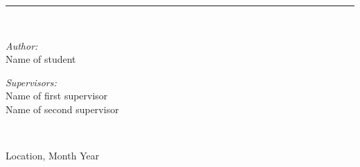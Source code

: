 \begin{titlepage}
\begin{center}
    \rule{350pt}{4pt} \\[4cm]

    \begin{minipage}{0.4\textwidth}
      \begin{flushleft} \large
        \emph{Author:} \\ [0.2cm]
        Name of student\\
      \end{flushleft}
    \end{minipage}
    \begin{minipage}{0.45\textwidth}
      \begin{flushright} \large
        \emph{Supervisors:} \\[0.2cm]
        Name of first supervisor\\[0.1cm]
        Name of second supervisor\\
      \end{flushright}
    \end{minipage}
    \\[1cm]
    \vfill

    \large Location, Month Year

  \end{center}
\end{titlepage}
